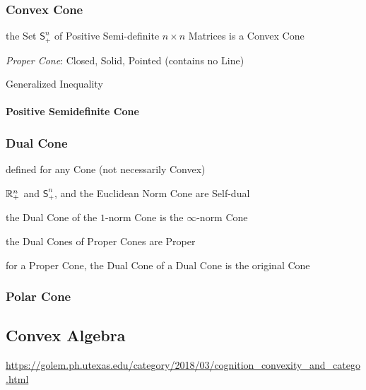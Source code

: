 \subsubsection{Convex Cone}\label{sec:convex_cone}

the Set $\mathsf{S}_+^n$ of Positive Semi-definite $n \times n$ Matrices is a
Convex Cone

\emph{Proper Cone}: Closed, Solid, Pointed (contains no Line)

Generalized Inequality



\paragraph{Positive Semidefinite Cone}
\label{sec:positive_semidefinite_cone}\hfill



\subsubsection{Dual Cone}\label{sec:dual_cone}

defined for any Cone (not necessarily Convex)

$\mathbb{R}_+^n$ and $\mathsf{S}_+^n$, and the Euclidean Norm Cone are Self-dual

the Dual Cone of the $1$-norm Cone is the $\infty$-norm Cone

the Dual Cones of Proper Cones are Proper

for a Proper Cone, the Dual Cone of a Dual Cone is the original Cone



\subsubsection{Polar Cone}\label{sec:polar_cone}



\subsection{Convex Algebra}\label{sec:convex_algebra}


\url{https://golem.ph.utexas.edu/category/2018/03/cognition_convexity_and_catego.html}



